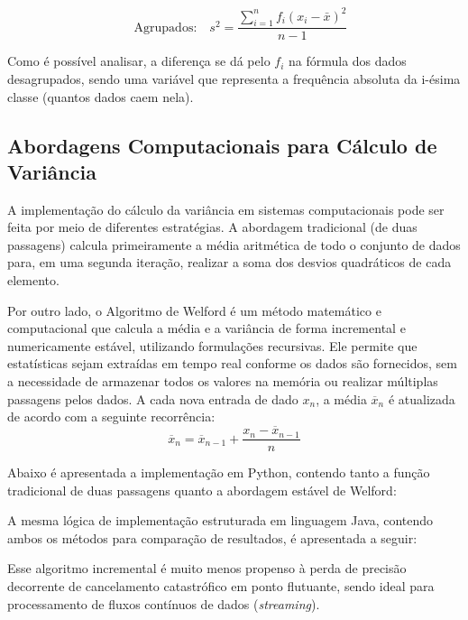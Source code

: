\begin{equation}
    \quad\mbox{Agrupados:}\quad
    s^{2} = \frac{\sum_{i=1}^{n} f_i(x_{i} - \bar{x})^{2}}{n - 1}
    \label{eq:variancia_agrupados}
\end{equation}

Como é possível analisar, a diferença se dá pelo \(f_i\) na fórmula dos dados desagrupados, sendo uma variável que representa a frequência absoluta da i-ésima classe (quantos dados caem nela).

\subsection{Abordagens Computacionais para Cálculo de Variância}

A implementação do cálculo da variância em sistemas computacionais pode ser feita por meio de diferentes estratégias. A abordagem tradicional (de duas passagens) calcula primeiramente a média aritmética de todo o conjunto de dados para, em uma segunda iteração, realizar a soma dos desvios quadráticos de cada elemento.

Por outro lado, o Algoritmo de Welford é um método matemático e computacional que calcula a média e a variância de forma incremental e numericamente estável, utilizando formulações recursivas. Ele permite que estatísticas sejam extraídas em tempo real conforme os dados são fornecidos, sem a necessidade de armazenar todos os valores na memória ou realizar múltiplas passagens pelos dados. A cada nova entrada de dado $x_n$, a média $\overline{x}_n$ é atualizada de acordo com a seguinte recorrência:
\begin{equation}
    \overline{x}_{n} = \overline{x}_{n-1} + \frac{x_{n} - \overline{x}_{n-1}}{n}
    \label{eq:welford_media}
\end{equation}

Abaixo é apresentada a implementação em Python, contendo tanto a função tradicional de duas passagens quanto a abordagem estável de Welford:


A mesma lógica de implementação estruturada em linguagem Java, contendo ambos os métodos para comparação de resultados, é apresentada a seguir:


Esse algoritmo incremental é muito menos propenso à perda de precisão decorrente de cancelamento catastrófico em ponto flutuante, sendo ideal para processamento de fluxos contínuos de dados (\textit{streaming}).



